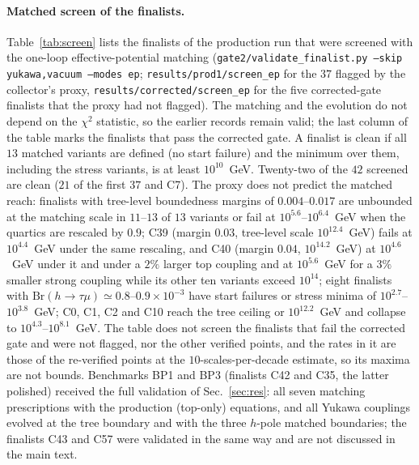 \documentclass[twocolumn,epjc3]{svjour3}
\newcommand{\Br}{\mathrm{Br}}
\begin{document}
\paragraph{Matched screen of the finalists.} Table~\ref{tab:screen} lists the finalists of the production run that were screened with the one-loop effective-potential matching (\texttt{gate2/validate\_finalist.py --skip yukawa,vacuum --modes ep}; \texttt{results/prod1/screen\_ep} for the $37$ flagged by the collector's proxy, \texttt{results/corrected/screen\_ep} for the five corrected-gate finalists that the proxy had not flagged). The matching and the evolution do not depend on the $\chi^2$ statistic, so the earlier records remain valid; the last column of the table marks the finalists that pass the corrected gate. A finalist is clean if all $13$ matched variants are defined (no start failure) and the minimum over them, including the stress variants, is at least $10^{10}$~GeV. Twenty-two of the $42$ screened are clean ($21$ of the first $37$ and C7). The proxy does not predict the matched reach: finalists with tree-level boundedness margins of $0.004$--$0.017$ are unbounded at the matching scale in $11$--$13$ of $13$ variants or fail at $10^{5.6}$--$10^{6.4}$~GeV when the quartics are rescaled by $0.9$; C39 (margin $0.03$, tree-level scale $10^{12.4}$~GeV) fails at $10^{4.4}$~GeV under the same rescaling, and C40 (margin $0.04$, $10^{14.2}$~GeV) at $10^{4.6}$~GeV under it and under a $2\%$ larger top coupling and at $10^{5.6}$~GeV for a $3\%$ smaller strong coupling while its other ten variants exceed $10^{14}$; eight finalists with $\Br(h\to\tau\mu)\simeq0.8$--$0.9\times10^{-3}$ have start failures or stress minima of $10^{2.7}$--$10^{3.8}$~GeV; C0, C1, C2 and C10 reach the tree ceiling or $10^{12.2}$~GeV and collapse to $10^{4.3}$--$10^{8.1}$~GeV. The table does not screen the finalists that fail the corrected gate and were not flagged, nor the other verified points, and the rates in it are those of the re-verified points at the $10$-scales-per-decade estimate, so its maxima are not bounds. Benchmarks BP1 and BP3 (finalists C42 and C35, the latter polished) received the full validation of Sec.~\ref{sec:res}: all seven matching prescriptions with the production (top-only) equations, and all Yukawa couplings evolved at the tree boundary and with the three $h$-pole matched boundaries; the finalists C43 and C57 were validated in the same way and are not discussed in the main text.
\end{document}
